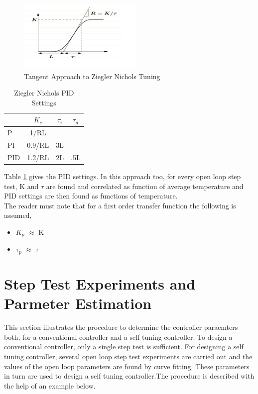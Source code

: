 \begin{figure}[h]
	\centering
\includegraphics[width = 0.7\linewidth]{Vikas_self/report_tex/ziegler.jpg}
	\caption{Tangent Approach to Ziegler Nichols Tuning}
	\label{ziegler}
\end{figure}


\begin{table}[h]
	\centering
	\begin{tabular}{|l||c|c|c|}\hline
		  & $K_c$ & $\tau_i$ & $\tau_d$ \\ \hline \hline
		P & 1/RL & & \\ \hline
		PI & 0.9/RL & 3L& \\ \hline
		PID & 1.2/RL & 2L & .5L\\ \hline
	\end{tabular}
	\caption{Ziegler Nichols PID Settings}
	\label{ziegler}
\end{table}


Table \ref{ziegler} gives the PID settings. In this approach too, for every open loop step test, K and $\tau$ are found and correlated as function of average temperature and PID settings are then found as functions of temperature.
\\The reader must note that for a first order transfer function the following is assumed,
\begin{itemize}
	\item $K_p$ $\approx$ K 
	\item $\tau_p$ $\approx$ $\tau$
\end{itemize}

\section{Step Test Experiments and Parmeter Estimation}
This section illustrates the procedure to determine the controller paraemters both, for a conventional controller and a self tuning controller. To design a conventional controller, only a single step test is sufficient. For designing a self tuning controller, several open loop step test experiments are carried out and the values of the open loop parameters are found by curve fitting. These parameters in turn are used to design a self tuning controller.The procedure is described with the help of an example below.
